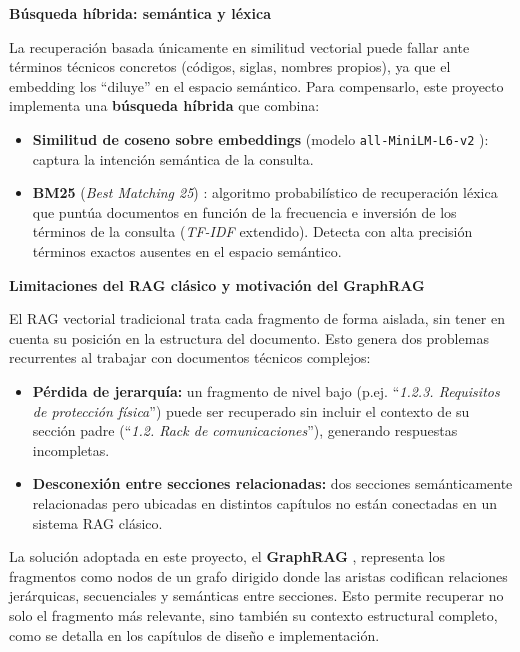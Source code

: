 \vspace{0.3cm}
\textbf{Búsqueda híbrida: semántica y léxica}

La recuperación basada únicamente en similitud vectorial puede fallar ante términos técnicos concretos (códigos, siglas, nombres propios), ya que el embedding los ``diluye'' en el espacio semántico. Para compensarlo, este proyecto implementa una \textbf{búsqueda híbrida} que combina:

\begin{itemize}
    \item \textbf{Similitud de coseno sobre embeddings} (modelo \texttt{all-MiniLM-L6-v2} \cite{Reimers2019}): captura la intención semántica de la consulta.
    \item \textbf{BM25} (\textit{Best Matching 25}) \cite{Robertson2009}: algoritmo probabilístico de recuperación léxica que puntúa documentos en función de la frecuencia e inversión de los términos de la consulta (\textit{TF-IDF} extendido). Detecta con alta precisión términos exactos ausentes en el espacio semántico.
\end{itemize}

\vspace{0.3cm}
\textbf{Limitaciones del RAG clásico y motivación del GraphRAG}

El RAG vectorial tradicional trata cada fragmento de forma aislada, sin tener en cuenta su posición en la estructura del documento. Esto genera dos problemas recurrentes al trabajar con documentos técnicos complejos:

\begin{itemize}
    \item \textbf{Pérdida de jerarquía:} un fragmento de nivel bajo (p.ej. ``\textit{1.2.3. Requisitos de protección física}'') puede ser recuperado sin incluir el contexto de su sección padre (``\textit{1.2. Rack de comunicaciones}''), generando respuestas incompletas.
    \item \textbf{Desconexión entre secciones relacionadas:} dos secciones semánticamente relacionadas pero ubicadas en distintos capítulos no están conectadas en un sistema RAG clásico.
\end{itemize}

La solución adoptada en este proyecto, el \textbf{GraphRAG} \cite{Edge2024}, representa los fragmentos como nodos de un grafo dirigido donde las aristas codifican relaciones jerárquicas, secuenciales y semánticas entre secciones. Esto permite recuperar no solo el fragmento más relevante, sino también su contexto estructural completo, como se detalla en los capítulos de diseño e implementación.

